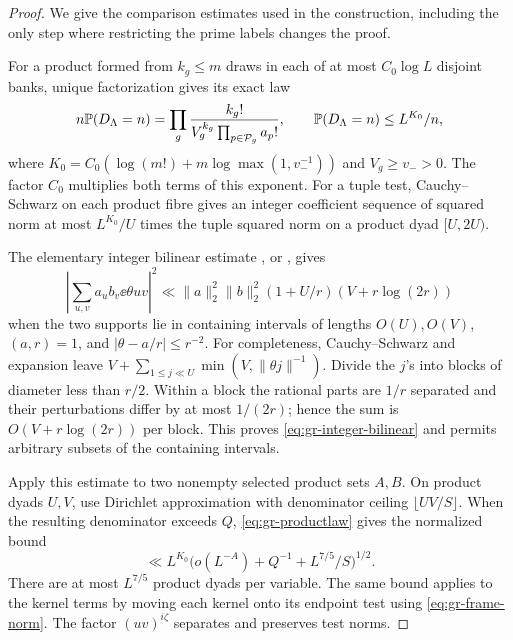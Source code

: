 \begin{proof}
We give the comparison estimates used in the construction, including
the only step where restricting the prime labels changes the proof.

For a product formed from \(k_g\le m\) draws in each of at most
\(C_0\log L\) disjoint banks, unique factorization gives its exact law
\begin{equation}
 n\mathbb P(D_\Lambda=n)
   =\prod_g\frac{k_g!}{V_g^{k_g}\prod_{p\in\mathcal P_g}a_p!},
 \qquad
 \mathbb P(D_\Lambda=n)\le L^{K_0}/n,                     \label{eq:gr-productlaw}
\end{equation}
where
\(K_0=C_0(\log(m!)+m\log\max(1,v_-^{-1}))\) and
\(V_g\ge v_->0\).
The factor \(C_0\) multiplies both terms of this exponent.
For a tuple test, Cauchy--Schwarz on each product fibre gives an
integer coefficient sequence of squared norm at most
\(L^{K_0}/U\) times the tuple squared norm on a product dyad
\([U,2U)\).

The elementary integer bilinear estimate
\cite[Lemma~4.2]{weightedgraphs}, or \cite[Lemma~6.2]{walsh}, gives
\begin{equation}
 \left|\sum_{u,v}a_ub_v\ee{\theta uv}\right|^2
 \ll \|a\|_2^2\|b\|_2^2
             (1+U/r)(V+r\log(2r))                  \label{eq:gr-integer-bilinear}
\end{equation}
when the two supports lie in containing intervals of lengths
\(O(U),O(V)\), \((a,r)=1\), and
\(|\theta-a/r|\le r^{-2}\).
For completeness, Cauchy--Schwarz and expansion leave
\(V+\sum_{1\le j\ll U}\min(V,\|\theta j\|^{-1})\).
Divide the \(j\)'s into blocks of diameter less than \(r/2\).
Within a block the rational parts are \(1/r\) separated and their
perturbations differ by at most \(1/(2r)\); hence the sum is
\(O(V+r\log(2r))\) per block.  This proves
\eqref{eq:gr-integer-bilinear} and permits arbitrary subsets of the
containing intervals.

Apply this estimate to two nonempty selected product sets \(A,B\).
On product dyads \(U,V\), use Dirichlet approximation with denominator
ceiling \(\lfloor UV/S\rfloor\).  When the resulting denominator
exceeds \(Q\), \eqref{eq:gr-productlaw} gives the normalized bound
\begin{equation}
 \ll L^{K_0}\big(o(L^{-A})+Q^{-1}+L^{7/5}/S\big)^{1/2}.
 \label{eq:gr-highden}
\end{equation}
There are at most \(L^{7/5}\) product dyads per variable.
The same bound applies to the kernel terms by moving each kernel
onto its endpoint test using \eqref{eq:gr-frame-norm}.
The factor \((uv)^{i\zeta}\) separates and preserves test norms.


\end{proof}
